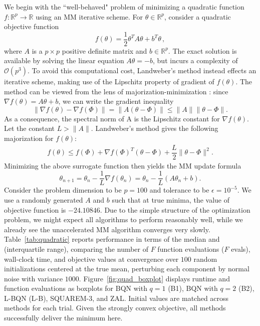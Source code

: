 \documentclass{statsoc}
\begin{document}
We begin with the ``well-behaved" problem of minimizing a quadratic function $f: \mathbb{R}^p \to \mathbb{R}$ using an MM iterative scheme. For $\theta \in \mathbb{R}^p$, consider a quadratic objective function
\[
f(\theta) = \dfrac{1}{2}\theta^T A \theta + b^T \theta\,,
\]
where $A$ is a $p \times p$ positive definite matrix and $b \in \mathbb{R}^p$. The exact solution is available by solving the linear equation $A\theta = -b$, but incurs a complexity of $\mathcal{O}(p^3)$.
  To avoid this computational cost, Landweber's method instead effects an iterative scheme, making use of the Lipschitz property of gradient of $f(\theta)$. The method can be viewed from the lens of majorization-minimization  \citep{lange2016mm}: since $\nabla f(\theta) = A \theta + b$, we can write the gradient inequality
%
\[
\|\nabla f(\theta) - \nabla f(\Phi)\| = \|A(\theta - \Phi)\| \leq \|A\|\|\theta - \Phi\| .
\]
%
As a consequence, the spectral norm of A is the Lipschitz constant for $\nabla f(\theta)$. Let the constant $L > \|A\|$. Landweber's method gives the following majorization for $f(\theta)$:
%
\begin{align*}
    f(\theta) \leq f(\Phi) + \nabla f(\Phi)^T (\theta - \Phi) + \dfrac{L}{2}\|\theta - \Phi\|^2 .
\end{align*}
Minimizing the above surrogate function then yields the MM update formula
\[
\theta_{n+1} = \theta_n - \dfrac{1}{L}\nabla f(\theta_n) = \theta_n - \dfrac{1}{L}(A\theta_n + b) .
\]
Consider the problem dimension to be $p=100$ and tolerance to be $\epsilon = 10^{-5}$. We use a randomly generated $A$ and $b$ such that at true minima, the value of objective function is $-24.10846$. Due to the simple structure of the optimization problem, we might expect all algorithms to perform reasonably well, while we already see the unaccelerated MM algorithm converges very slowly.  %
Table~\ref{tab:quadratic} reports performance in terms of the median and (interquartile range), comparing the number of $F$ function evaluations ($F$ evals), wall-clock time, and objective values at convergence over $100$ random initializations centered at the true mean, perturbing each component by normal noise with variance $1000$. Figure~\ref{fig:quad_boxplot} displays runtime and function evaluations as boxplots for BQN with $q=1$ (B1), BQN with $q=2$ (B2), L-BQN (L-B), SQUAREM-3, and ZAL. Initial values are matched across methods for each trial.   %
Given the strongly convex objective, all methods successfully deliver the minimum here. 
\end{document}

